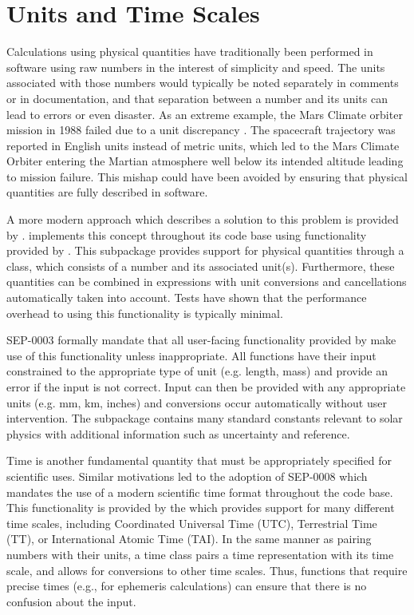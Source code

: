 \section{Units and Time Scales}
\label{sec:units}

Calculations using physical quantities have traditionally been performed in software using raw numbers in the interest of simplicity and speed.
The units associated with those numbers would typically be noted separately in comments or in documentation, and that separation between a number and its units can lead to errors or even disaster.
As an extreme example, the Mars Climate orbiter mission in 1988 failed due to a unit discrepancy \citep{mco_mishap_report}.
The spacecraft trajectory was reported in English units instead of metric units, which led to the Mars Climate Orbiter entering the Martian atmosphere well below its intended altitude leading to mission failure.
This mishap could have been avoided by ensuring that physical quantities are fully described in software.

A more modern approach which describes a solution to this problem is provided by \citet{Damevski2009}.
\sunpypkg implements this concept throughout its code base using  functionality provided by .
This subpackage provides support for physical quantities through a class, which consists of a number and its associated unit(s).
Furthermore, these quantities can be combined in expressions with unit conversions and cancellations automatically taken into account.
Tests have shown that the performance overhead to using this functionality is typically minimal.

SEP-0003 \citep{sep-0003} formally mandate that all user-facing functionality provided by \sunpypkg make use of this functionality unless inappropriate.
All functions have their input constrained to the appropriate type of unit (e.g. length, mass) and provide an error if the input is not correct.
Input can then be provided with any appropriate units (e.g. mm, km, inches) and conversions occur automatically without user intervention.
The  subpackage contains many standard constants relevant to solar physics with additional information such as uncertainty and reference.

Time is another fundamental quantity that must be appropriately specified for scientific uses.
Similar motivations led to the adoption of SEP-0008 \citep{sep-0008} which mandates the use of a modern scientific time format throughout the \sunpypkg code base.
This functionality is provided by the  which provides support for many different time scales, including Coordinated Universal Time (UTC), Terrestrial Time (TT), or International Atomic Time (TAI).
In the same manner as pairing numbers with their units, a time class pairs a time representation with its time scale, and allows for conversions to other time scales.
Thus, functions that require precise times (e.g., for ephemeris calculations) can ensure that there is no confusion about the input.
